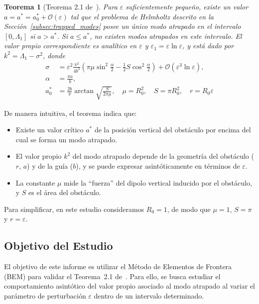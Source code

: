 \documentclass[11pt]{article}
\newtheorem{theorem}{Teorema}
\begin{document}
\begin{theorem}[Teorema 2.1 de~\cite{Zhevandrov2025}]
Para $\varepsilon$ suficientemente pequeño, existe un valor $a = a^* = a_0^* + \mathcal{O}(\varepsilon)$ tal que el problema de Helmholtz descrito en la Sección~\ref{subsec:trapped_modes} posee un único modo atrapado en el intervalo $[0, \Lambda_1]$ si $a > a^*$. Si $a \le a^*$, no existen modos atrapados en este intervalo. El valor propio correspondiente es analítico en $\varepsilon$ y $\varepsilon_1 = \varepsilon \ln \varepsilon$, y está dado por $k^2 = \Lambda_1 - \sigma^2$, donde
\begin{align}
\sigma &= \varepsilon^2\frac{\pi^2}{4b^3} \left( \pi \mu\sin^2 \frac{\alpha}{2} - \frac{1}{2} S \cos^2 \frac{\alpha}{2} \right) + \mathcal{O}(\varepsilon^3 \ln \varepsilon), \\
\alpha &= \frac{\pi a}{b}, \\
a_0^* &= \frac{2b}{\pi} \arctan \sqrt{\frac{S}{2\pi\mu}}, \quad \mu = R_0^2, \quad S = \pi R_0^2, \quad r = R_0\varepsilon
\end{align}
\end{theorem}

De manera intuitiva, el teorema indica que:
\begin{itemize}
    \item Existe un valor crítico \(a^*\) de la posición vertical del obstáculo por encima del cual se forma un modo atrapado.
    \item El valor propio \(k^2\) del modo atrapado depende de la geometría del obstáculo (\(r\), \(a\)) y de la guía (\(b\)), y se puede expresar asintóticamente en términos de \(\varepsilon\).
    \item La constante \(\mu\) mide la ``fuerza'' del dipolo vertical inducido por el obstáculo, y \(S\) es el área del obstáculo.
\end{itemize}

Para simplificar, en este estudio consideramos \(R_0 = 1\), de modo que \(\mu = 1\), \(S = \pi\) y \(r = \varepsilon\).

\subsection{Objetivo del Estudio}\label{subsec:objetivo_estudio}

El objetivo de este informe es utilizar el Método de Elementos de Frontera (BEM) para validar el Teorema~2.1 de~\cite{Zhevandrov2025}. Para ello, se busca estudiar el comportamiento asintótico del valor propio asociado al modo atrapado al variar el parámetro de perturbación $\varepsilon$ dentro de un intervalo determinado.
\end{document}
